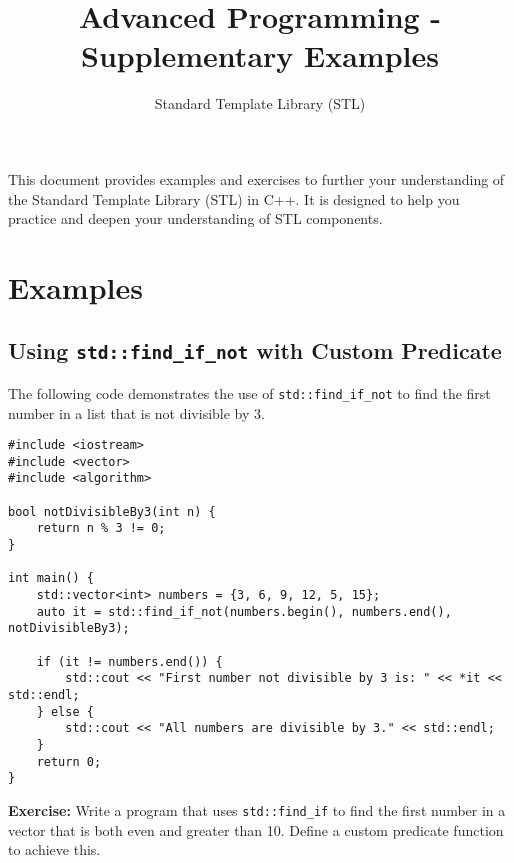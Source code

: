 \documentclass{article}
\title{Advanced Programming - Supplementary Examples}
\author{Standard Template Library (STL)}
\date{}
\begin{document}
\maketitle

This document provides examples and exercises to further your understanding of the Standard Template Library (STL) in C++. It is designed to help you practice and deepen your understanding of STL components.

\section*{Examples}

\subsection*{ Using \texttt{std::find\_if\_not} with Custom Predicate}
The following code demonstrates the use of \texttt{std::find\_if\_not} to find the first number in a list that is not divisible by 3.

\begin{verbatim}
#include <iostream>
#include <vector>
#include <algorithm>

bool notDivisibleBy3(int n) {
    return n % 3 != 0;
}

int main() {
    std::vector<int> numbers = {3, 6, 9, 12, 5, 15};
    auto it = std::find_if_not(numbers.begin(), numbers.end(), notDivisibleBy3);

    if (it != numbers.end()) {
        std::cout << "First number not divisible by 3 is: " << *it << std::endl;
    } else {
        std::cout << "All numbers are divisible by 3." << std::endl;
    }
    return 0;
}
\end{verbatim}

\textbf{Exercise:} Write a program that uses \texttt{std::find\_if} to find the first number in a vector that is both even and greater than 10. Define a custom predicate function to achieve this.
\end{document}

